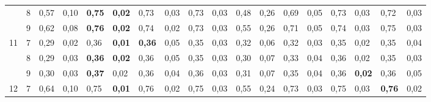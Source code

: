 \documentclass[conference]{IEEEtran}
\begin{document}
\begin{table}[]
\begin{tabular}{|cl|ll|ll|ll|ll|ll|ll|ll|ll|}
		\multicolumn{1}{|c|}{}                    & 8 & \multicolumn{1}{l|}{0,57} & 0,10          & \multicolumn{1}{l|}{\textbf{0,75}} & \textbf{0,02} & \multicolumn{1}{l|}{0,73}          & 0,03 & \multicolumn{1}{l|}{0,73}          & 0,03 & \multicolumn{1}{l|}{0,48}                 & 0,26 & \multicolumn{1}{l|}{0,69} & 0,05 & \multicolumn{1}{l|}{0,73}          & 0,03          & \multicolumn{1}{l|}{0,72}          & 0,03          \\ \cline{2-18} 
		\multicolumn{1}{|c|}{}                    & 9 & \multicolumn{1}{l|}{0,62} & 0,08          & \multicolumn{1}{l|}{\textbf{0,76}} & \textbf{0,02} & \multicolumn{1}{l|}{0,74}          & 0,02 & \multicolumn{1}{l|}{0,73}          & 0,03 & \multicolumn{1}{l|}{0,55}                 & 0,26 & \multicolumn{1}{l|}{0,71} & 0,05 & \multicolumn{1}{l|}{0,74}          & 0,03          & \multicolumn{1}{l|}{0,75}          & 0,03          \\ \hline
		\multicolumn{1}{|c|}{\multirow{3}{*}{11}} & 7 & \multicolumn{1}{l|}{0,29} & 0,02          & \multicolumn{1}{l|}{0,36}          & \textbf{0,01} & \multicolumn{1}{l|}{\textbf{0,36}} & 0,05 & \multicolumn{1}{l|}{0,35}          & 0,03 & \multicolumn{1}{l|}{0,32}                 & 0,06 & \multicolumn{1}{l|}{0,32} & 0,03 & \multicolumn{1}{l|}{0,35}          & 0,02          & \multicolumn{1}{l|}{0,35}          & 0,04          \\ \cline{2-18} 
		\multicolumn{1}{|c|}{}                    & 8 & \multicolumn{1}{l|}{0,29} & 0,03          & \multicolumn{1}{l|}{\textbf{0,36}} & \textbf{0,02} & \multicolumn{1}{l|}{0,36}          & 0,05 & \multicolumn{1}{l|}{0,35}          & 0,03 & \multicolumn{1}{l|}{0,30}                 & 0,07 & \multicolumn{1}{l|}{0,33} & 0,04 & \multicolumn{1}{l|}{0,36}          & 0,02          & \multicolumn{1}{l|}{0,35}          & 0,03          \\ \cline{2-18} 
		\multicolumn{1}{|c|}{}                    & 9 & \multicolumn{1}{l|}{0,30} & 0,03          & \multicolumn{1}{l|}{\textbf{0,37}} & 0,02          & \multicolumn{1}{l|}{0,36}          & 0,04 & \multicolumn{1}{l|}{0,36}          & 0,03 & \multicolumn{1}{l|}{0,31}                 & 0,07 & \multicolumn{1}{l|}{0,35} & 0,04 & \multicolumn{1}{l|}{0,36}          & \textbf{0,02} & \multicolumn{1}{l|}{0,36}          & 0,05          \\ \hline
		\multicolumn{1}{|c|}{\multirow{3}{*}{12}} & 7 & \multicolumn{1}{l|}{0,64} & 0,10          & \multicolumn{1}{l|}{0,75}          & \textbf{0,01} & \multicolumn{1}{l|}{0,76}          & 0,02 & \multicolumn{1}{l|}{0,75}          & 0,03 & \multicolumn{1}{l|}{0,55}                 & 0,24 & \multicolumn{1}{l|}{0,73} & 0,03 & \multicolumn{1}{l|}{0,75}          & 0,03          & \multicolumn{1}{l|}{\textbf{0,76}} & 0,02          \\ \cline{2-18} 

\end{tabular}
\end{table}
\end{document}
